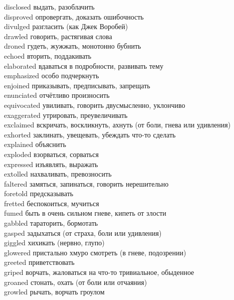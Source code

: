 \documentclass[a4paper,12pt,fleqn]{book}\usepackage{polyglossia}\setdefaultlanguage[babelshorthands=true]{russian}\setotherlanguage{english}\defaultfontfeatures{Ligatures=TeX,Mapping=tex-text}\usepackage{xcolor}\newcommand{\ml}[3]{#2}
\begin{document}
{disclosed \hfill выдать, разоблачить\\
disproved \hfill опровергать, доказать ошибочность\\
divulged \hfill разгласить (как Джек Воробей)\\
drawled \hfill говорить, растягивая слова\\
droned \hfill гудеть, жужжать, монотонно бубнить\\
echoed \hfill вторить, поддакивать\\
elaborated \hfill вдаваться в подробности, развивать тему\\
emphasized \hfill особо подчеркнуть\\
enjoined \hfill приказывать, предписывать, запрещать\\
enunciated \hfill отчётливо произносить\\
equivocated \hfill увиливать, говорить двусмысленно, уклончиво\\
exaggerated \hfill утрировать, преувеличивать\\
exclaimed \hfill вскричать, воскликнуть, ахнуть (от боли, гнева или удивления)\\
exhorted \hfill заклинать, увещевать, убеждать что-то сделать\\
explained \hfill объяснить\\
exploded \hfill взорваться, сорваться\\
expressed \hfill изъявлять, выражать\\
extolled \hfill нахваливать, превозносить\\
faltered \hfill замяться, запинаться, говорить нерешительно\\
foretold \hfill предсказывать\\
fretted \hfill беспокоиться, мучиться\\
fumed \hfill быть в очень сильном гневе, кипеть от злости\\
gabbled \hfill тараторить, бормотать\\
gasped \hfill задыхаться (от страха, боли или удивления)\\
giggled \hfill хихикать (нервно, глупо)\\
glowered \hfill пристально хмуро смотреть (в гневе, подозрении)\\
greeted \hfill приветствовать\\
griped \hfill ворчать, жаловаться на что-то тривиальное, обыденное\\
groaned \hfill стонать, охать (от боли или отчаяния)\\
growled \hfill рычать, ворчать гроулом\\
}
\end{document}
